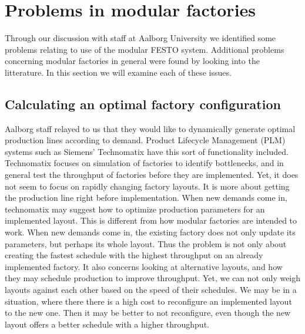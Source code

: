 \section{Problems in modular factories}
Through our discussion with staff at Aalborg University we identified some problems relating to use of the modular FESTO system. Additional problems concerning modular factories in general were found by looking into the litterature. In this section we will examine each of these issues. 

\subsection{Calculating an optimal factory configuration}
Aalborg staff relayed to us that they would like to dynamically generate optimal production lines according to demand. Product Lifecycle Management (PLM) systems such as Siemens' Technomatix \cite{Siemens2014} have this sort of functionality included. Technomatix focuses on simulation of factories to identify bottlenecks, and in general test the throughput of factories before they are implemented. Yet, it does not seem to focus on rapidly changing factory layouts. It is more about getting the production line right before implementation. When new demands come in, technomatix may suggest how to optimize production parameters for an implemented layout. This is different from how modular factories are intended to work. When new demands come in, the existing factory does not only update its parameters, but perhaps its whole layout. Thus the problem is not only about creating the fastest schedule with the highest throughput on an already implemented factory. It also concerns looking at alternative layouts, and how they may schedule production to improve throughput. Yet, we can not only weigh layouts against each other based on the speed of their schedules. We may be in a situation, where there there is a high cost to reconfigure an implemented layout to the new one. Then it may be better to not reconfigure, even though the new layout offers a better schedule with a higher throughput. 


